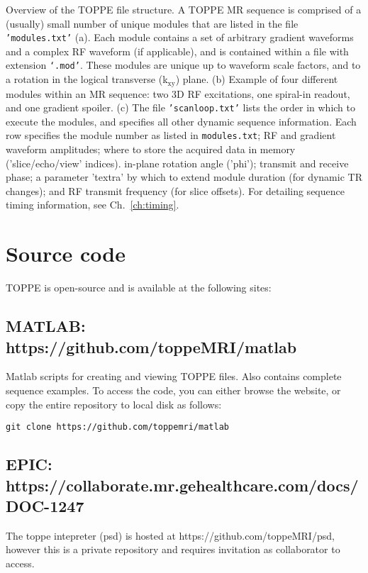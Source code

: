 {
Overview of the TOPPE file structure.
A TOPPE MR sequence is comprised of a (usually) small number of unique modules that are listed in the file \texttt{'modules.txt'} (a).
Each module contains a set of arbitrary gradient waveforms and a complex RF waveform (if applicable), and is contained within a file with extension \texttt{`.mod'}.
These modules are unique up to waveform scale factors, and to a rotation in the logical transverse (k$_\textrm{xy}$) plane.
(b) Example of four different modules within an MR sequence: two 3D RF excitations, one spiral-in readout, and one gradient spoiler.
(c) The file \texttt{'scanloop.txt'} lists the order in which to execute the modules, and specifies all other dynamic sequence information.
Each row specifies the module number as listed in \texttt{modules.txt}; RF and gradient waveform amplitudes;
where to store the acquired data in memory ('slice/echo/view' indices).
in-plane rotation angle ('phi');
transmit and receive phase;
a parameter 'textra' by which to extend module duration (for dynamic TR changes);
and RF transmit frequency (for slice offsets).
For detailing sequence timing information, see Ch.~\ref{ch:timing}.
}


\section{Source code}

TOPPE is open-source and is available at the following sites:

\subsection{MATLAB: https://github.com/toppeMRI/matlab}

Matlab scripts for creating and viewing TOPPE files. Also contains complete sequence examples.
To access the code, you can either browse the website, or copy the entire repository to local disk as follows:

\begin{lstlisting}
git clone https://github.com/toppemri/matlab
\end{lstlisting}


\subsection{EPIC: https://collaborate.mr.gehealthcare.com/docs/DOC-1247}

The toppe intepreter (psd) is hosted at {https://github.com/toppeMRI/psd}, however this is a private repository and requires invitation as collaborator to access.

